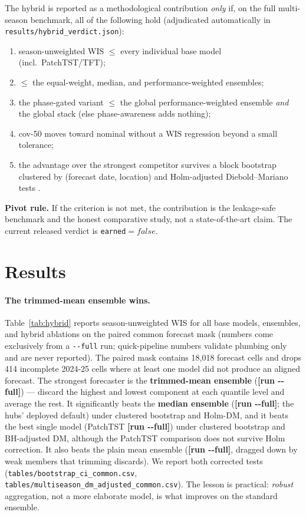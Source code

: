 \documentclass{article}
\providecommand{\msEnsTrimmedWIS}{\textbf{[run -{}-full]}}
\providecommand{\msEnsMeanWIS}{\textbf{[run -{}-full]}}
\providecommand{\msEnsMedianWIS}{\textbf{[run -{}-full]}}
\providecommand{\msPatchTSTWIS}{\textbf{[run -{}-full]}}
\providecommand{\hybridEarned}{false}
\begin{document}
The hybrid is reported as a methodological contribution \emph{only} if, on the full multi-season
benchmark, all of the following hold (adjudicated automatically in
\texttt{results/hybrid\_verdict.json}):
\begin{enumerate}
  \item season-unweighted WIS $\le$ every individual base model (incl.\ PatchTST/TFT);
  \item $\le$ the equal-weight, median, and performance-weighted ensembles;
  \item the phase-gated variant $\le$ the global performance-weighted ensemble \emph{and} the
        global stack (else phase-awareness adds nothing);
  \item cov-50 moves toward nominal without a WIS regression beyond a small tolerance;
  \item the advantage over the strongest competitor survives a block bootstrap clustered by
        (forecast date, location) and Holm-adjusted Diebold--Mariano tests \cite{dm1995,harvey1997}.
\end{enumerate}
\textbf{Pivot rule.} If the criterion is not met, the contribution is the leakage-safe benchmark and
the honest comparative study, not a state-of-the-art claim. The current released verdict is
\texttt{earned}$=\hybridEarned$.

\section{Results}

\paragraph{The trimmed-mean ensemble wins.} Table~\ref{tab:hybrid} reports season-unweighted WIS for
all base models, ensembles, and hybrid ablations on the paired common forecast mask (numbers come
exclusively from a \texttt{-{}-full} run; quick-pipeline numbers validate plumbing only and are never
reported). The paired mask contains 18{,}018 forecast cells and drops 414 incomplete 2024-25 cells
where at least one model did not produce an aligned forecast. The strongest forecaster
is the \textbf{trimmed-mean ensemble} (\msEnsTrimmedWIS{}) --- discard the highest and lowest
component at each quantile level and average the rest. It significantly beats the \textbf{median
ensemble} (\msEnsMedianWIS{}; the hubs' deployed default) under clustered bootstrap and Holm-DM,
and it beats the best single model (PatchTST \msPatchTSTWIS{}) under clustered bootstrap and
BH-adjusted DM, although the PatchTST comparison does not survive Holm correction. It also beats
the plain mean ensemble (\msEnsMeanWIS{}, dragged down by weak members that trimming discards).
We report both corrected tests (\texttt{tables/bootstrap\_ci\_common.csv},
\texttt{tables/multiseason\_dm\_adjusted\_common.csv}). The lesson is practical:
\emph{robust} aggregation,
not a more elaborate model, is what improves on the standard ensemble.
\end{document}
